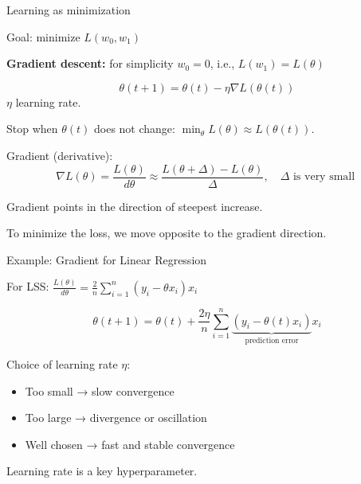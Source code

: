 \documentclass{beamer}
\begin{document}
\begin{frame}{Learning as minimization}

Goal: minimize $L(w_0,w_1)$


\textbf{Gradient descent:}
for simplicity $w_0=0$, i.e., $L(w_1)=L(\theta)$

\[
\theta(t+1) = \theta(t) - \eta \nabla L(\theta(t))
\]
$\eta$ learning rate. 

\medskip

Stop when $\theta(t)$ does not change:
\( \min_{\theta} L(\theta) \approx L(\theta(t)) \).

\medskip 

Gradient (derivative):
\[
   \nabla L(\theta)=\frac{L(\theta)}{d\theta} \approx \frac{L(\theta+\Delta)-L(\theta)}{\Delta}, \quad \Delta \mbox{ is very small }
\]

Gradient points in the direction of steepest increase.

\medskip

To minimize the loss, we move opposite to the gradient direction.

\end{frame}
\begin{frame}{Example: Gradient for Linear Regression}

For LSS:
\(
  \frac{L(\theta)}{d\theta} = 
   \frac{2}{n} \sum_{i=1}^n (y_i - \theta x_i)x_i
\)

\[
\theta(t+1) = \theta(t) +  
   \frac{2\eta}{n} \sum_{i=1}^n \underbrace{(y_i - \theta(t) x_i)}_{\mbox{prediction error}}x_i
\]

Choice of learning rate $\eta$:

\begin{itemize}
    \item Too small → slow convergence
    \item Too large → divergence or oscillation
    \item Well chosen → fast and stable convergence
\end{itemize}

\vspace{0.5cm}

Learning rate is a key hyperparameter.

\end{frame}
\end{document}
